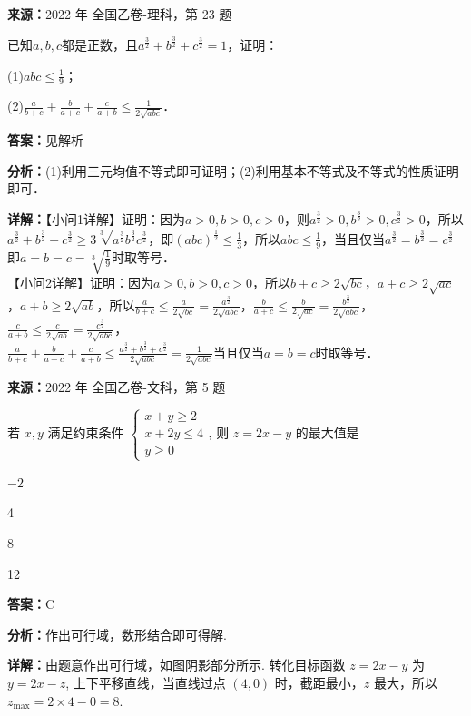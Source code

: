 \begin{question}[points=10]
\textbf{来源：}2022 年 全国乙卷-理科，第 23 题\par
[选修4-5：不等式选讲]

已知$a,b,c$都是正数，且$a^{\frac{3}{2}}+b^{\frac{3}{2}}+c^{\frac{3}{2}}=1$，证明：

(1)$abc\leq\frac{1}{9}$；

(2)$\frac{a}{b+c}+\frac{b}{a+c}+\frac{c}{a+b}\leq\frac{1}{2\sqrt{abc}}$．
\begin{solution}
\textbf{答案：}见解析

\textbf{分析：}(1)利用三元均值不等式即可证明；(2)利用基本不等式及不等式的性质证明即可．

\textbf{详解：}【小问1详解】证明：因为$a>0,b>0,c>0$，则$a^{\frac{3}{2}}>0,b^{\frac{3}{2}}>0,c^{\frac{3}{2}}>0$，所以$a^{\frac{3}{2}}+b^{\frac{3}{2}}+c^{\frac{3}{2}}\geq 3\sqrt[3]{a^{\frac{3}{2}}b^{\frac{3}{2}}c^{\frac{3}{2}}}$，即$(abc)^{\frac{1}{2}}\leq\frac{1}{3}$，所以$abc\leq\frac{1}{9}$，当且仅当$a^{\frac{3}{2}}=b^{\frac{3}{2}}=c^{\frac{3}{2}}$即$a=b=c=\sqrt[3]{\frac{1}{9}}$时取等号．\\【小问2详解】证明：因为$a>0,b>0,c>0$，所以$b+c\geq 2\sqrt{bc}$，$a+c\geq 2\sqrt{ac}$，$a+b\geq 2\sqrt{ab}$，所以$\frac{a}{b+c}\leq\frac{a}{2\sqrt{bc}}=\frac{a^{\frac{3}{2}}}{2\sqrt{abc}}$，$\frac{b}{a+c}\leq\frac{b}{2\sqrt{ac}}=\frac{b^{\frac{3}{2}}}{2\sqrt{abc}}$，$\frac{c}{a+b}\leq\frac{c}{2\sqrt{ab}}=\frac{c^{\frac{3}{2}}}{2\sqrt{abc}}$，\\$\frac{a}{b+c}+\frac{b}{a+c}+\frac{c}{a+b}\leq\frac{a^{\frac{3}{2}}+b^{\frac{3}{2}}+c^{\frac{3}{2}}}{2\sqrt{abc}}=\frac{1}{2\sqrt{abc}}$当且仅当$a=b=c$时取等号．
\end{solution}
\end{question}

\begin{question}[points=5]
\textbf{来源：}2022 年 全国乙卷-文科，第 5 题\par
若 $x, y$ 满足约束条件 $\begin{cases} x+y \ge 2 \\ x+2y \le 4 \\ y \ge 0 \end{cases}$, 则 $z = 2x - y$ 的最大值是
\begin{choices}
  \item $-2$
  \item 4
  \item 8
  \item 12
\end{choices}
\begin{solution}
\textbf{答案：}C

\textbf{分析：}作出可行域，数形结合即可得解.

\textbf{详解：}由题意作出可行域，如图阴影部分所示. 转化目标函数 $z=2x-y$ 为 $y=2x-z$, 上下平移直线，当直线过点 $(4,0)$ 时，截距最小，$z$ 最大，所以 $z_{\max}=2\times4-0=8$.
\end{solution}
\end{question}


